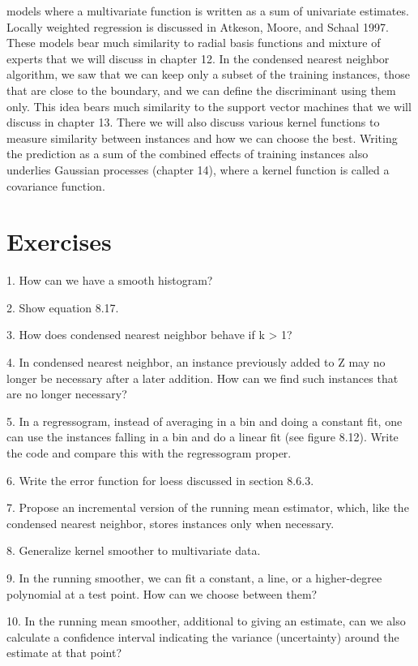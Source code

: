 models where a multivariate function is written as a sum of univariate estimates. Locally weighted regression is discussed in Atkeson, Moore, and Schaal 1997. These models bear much similarity to radial basis functions and mixture of experts that we will discuss in chapter 12. In the condensed nearest neighbor algorithm, we saw that we can keep only a subset of the training instances, those that are close to the boundary, and we can define the discriminant using them only. This idea bears much similarity to the support vector machines that we will discuss in chapter 13. There we will also discuss various kernel functions to measure similarity between instances and how we can choose the best. Writing the prediction as a sum of the combined effects of training instances also underlies Gaussian processes (chapter 14), where a kernel function is called a covariance function.

\section{Exercises}

1. How can we have a smooth histogram?

2. Show equation 8.17.

3. How does condensed nearest neighbor behave if k > 1?

4. In condensed nearest neighbor, an instance previously added to Z may no longer be necessary after a later addition. How can we find such instances that are no longer necessary?

5. In a regressogram, instead of averaging in a bin and doing a constant fit, one can use the instances falling in a bin and do a linear fit (see figure 8.12). Write the code and compare this with the regressogram proper.

6. Write the error function for loess discussed in section 8.6.3.

7. Propose an incremental version of the running mean estimator, which, like the condensed nearest neighbor, stores instances only when necessary.

8. Generalize kernel smoother to multivariate data.

9. In the running smoother, we can fit a constant, a line, or a higher-degree polynomial at a test point. How can we choose between them?

10. In the running mean smoother, additional to giving an estimate, can we also calculate a confidence interval indicating the variance (uncertainty) around the estimate at that point?

